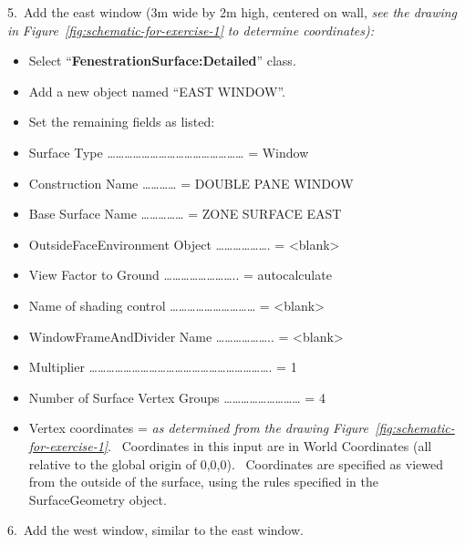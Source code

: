 5.~Add the east window (3m wide by 2m high, centered on wall, \emph{see the drawing in} \emph{Figure~\ref{fig:schematic-for-exercise-1}} \emph{to determine coordinates):}

\begin{itemize}
\item
  Select ``\textbf{FenestrationSurface:Detailed}'' class.
\item
  Add a new object named ``EAST WINDOW''.
\item
  Set the remaining fields as listed:
\item
  Surface Type \ldots{}\ldots{}\ldots{}\ldots{}\ldots{}\ldots{}\ldots{}\ldots{}\ldots{}\ldots{}\ldots{}\ldots{}\ldots{}\ldots{}\ldots{}\ldots{} = Window
\item
  Construction Name \ldots{}\ldots{}\ldots{}\ldots{} = DOUBLE PANE WINDOW
\item
  Base Surface Name \ldots{}\ldots{}\ldots{}\ldots{}\ldots{} = ZONE SURFACE EAST
\item
  OutsideFaceEnvironment Object \ldots{}\ldots{}\ldots{}\ldots{}\ldots{}\ldots{}. = \textless{}blank\textgreater{}
\item
  View Factor to Ground \ldots{}\ldots{}\ldots{}\ldots{}\ldots{}\ldots{}\ldots{}\ldots{}.. = autocalculate
\item
  Name of shading control \ldots{}\ldots{}\ldots{}\ldots{}\ldots{}\ldots{}\ldots{}\ldots{}\ldots{}\ldots{} = \textless{}blank\textgreater{}
\item
  WindowFrameAndDivider Name \ldots{}\ldots{}\ldots{}\ldots{}\ldots{}\ldots{}.. = \textless{}blank\textgreater{}
\item
  Multiplier \ldots{}\ldots{}\ldots{}\ldots{}\ldots{}\ldots{}\ldots{}\ldots{}\ldots{}\ldots{}\ldots{}\ldots{}\ldots{}\ldots{}\ldots{}\ldots{}\ldots{}\ldots{}\ldots{}\ldots{}\ldots{}. = 1
\item
  Number of Surface Vertex Groups \ldots{}\ldots{}\ldots{}\ldots{}\ldots{}\ldots{}\ldots{}\ldots{}\ldots{} = 4
\item
  Vertex coordinates = \emph{as determined from the drawing} \emph{Figure~\ref{fig:schematic-for-exercise-1}}.~ Coordinates in this input are in World Coordinates (all relative to the global origin of 0,0,0).~ Coordinates are specified as viewed from the outside of the surface, using the rules specified in the SurfaceGeometry object.
\end{itemize}

6.~Add the west window, similar to the east window.

